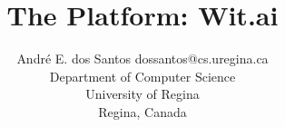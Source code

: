 \documentclass[twoside,11pt]{article}
\begin{document}
\title{The Platform: Wit.ai}

\author{\name André E. dos Santos \email dossantos@cs.uregina.ca \\
\addr Department of Computer Science \\
University of Regina \\ 
Regina, Canada
}



\maketitle

\begin{abstract}%
\end{abstract}


%
%
%
%
%

\vskip 0.2in

\end{document}
